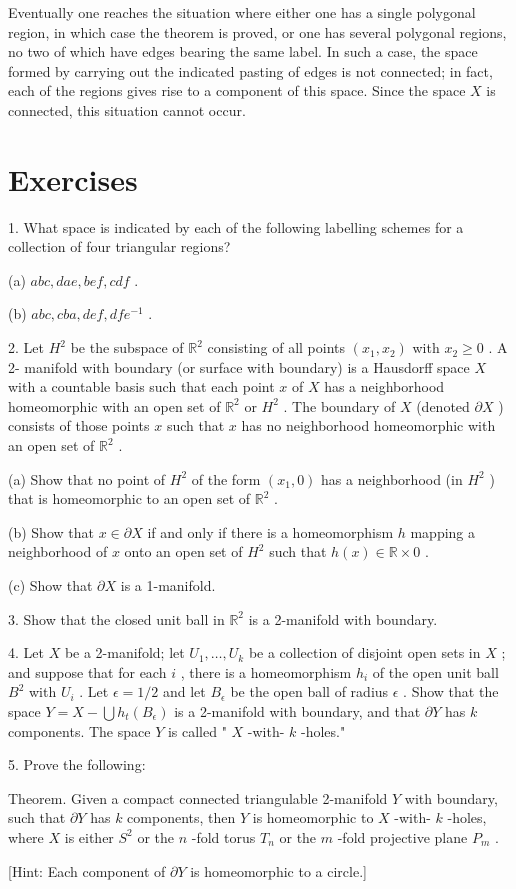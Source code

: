 Eventually one reaches the situation where either one has a single polygonal region, in which case the theorem is proved, or one has several polygonal regions, no two of which have edges bearing the same label. In such a case, the space formed by carrying out the indicated pasting of edges is not connected; in fact, each of the regions gives rise to a component of this space. Since the space \(X\) is connected, this situation cannot occur.

\section*{Exercises}

1. What space is indicated by each of the following labelling schemes for a collection of four triangular regions?

(a) \({abc},{dae},{bef},{cdf}\) .

(b) \({abc},{cba},{def},{df}{e}^{-1}\) .

2. Let \({H}^{2}\) be the subspace of \({\mathbb{R}}^{2}\) consisting of all points \(\left( {{x}_{1},{x}_{2}}\right)\) with \({x}_{2} \geq  0\) . A 2- manifold with boundary (or surface with boundary) is a Hausdorff space \(X\) with a countable basis such that each point \(x\) of \(X\) has a neighborhood homeomorphic with an open set of \({\mathbb{R}}^{2}\) or \({H}^{2}\) . The boundary of \(X\) (denoted \(\partial X\) ) consists of those points \(x\) such that \(x\) has no neighborhood homeomorphic with an open set of \({\mathbb{R}}^{2}\) .

(a) Show that no point of \({H}^{2}\) of the form \(\left( {{x}_{1},0}\right)\) has a neighborhood (in \({H}^{2}\) ) that is homeomorphic to an open set of \({\mathbb{R}}^{2}\) .

(b) Show that \(x \in  \partial X\) if and only if there is a homeomorphism \(h\) mapping a neighborhood of \(x\) onto an open set of \({H}^{2}\) such that \(h\left( x\right)  \in  \mathbb{R} \times  0\) .

(c) Show that \(\partial X\) is a 1-manifold.

3. Show that the closed unit ball in \({\mathbb{R}}^{2}\) is a 2-manifold with boundary.

4. Let \(X\) be a 2-manifold; let \({U}_{1},\ldots ,{U}_{k}\) be a collection of disjoint open sets in \(X\) ; and suppose that for each \(i\) , there is a homeomorphism \({h}_{i}\) of the open unit ball \({B}^{2}\) with \({U}_{i}\) . Let \(\epsilon  = 1/2\) and let \({B}_{\epsilon }\) be the open ball of radius \(\epsilon\) . Show that the space \(Y = X - \bigcup {h}_{t}\left( {B}_{\epsilon }\right)\) is a 2-manifold with boundary, and that \(\partial Y\) has \(k\) components. The space \(Y\) is called " \(X\) -with- \(k\) -holes."

5. Prove the following:

Theorem. Given a compact connected triangulable 2-manifold \(Y\) with boundary, such that \(\partial Y\) has \(k\) components, then \(Y\) is homeomorphic to \(X\) -with- \(k\) -holes, where \(X\) is either \({S}^{2}\) or the \(n\) -fold torus \({T}_{n}\) or the \(m\) -fold projective plane \({P}_{m}\) .

[Hint: Each component of \(\partial Y\) is homeomorphic to a circle.]